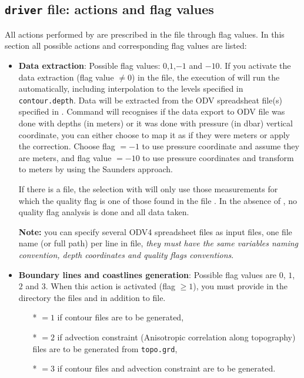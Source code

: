 \pagebreak 

\subsection{{\tt driver} file: actions and flag values\label{driverflags}}

All actions performed by  are prescribed in the file  through flag values. In this section all possible actions and corresponding flag values are listed:

\begin{itemize}
\item {\bf Data extraction}: Possible flag values: $0$,$1$,$-1$ and $-10$. If you activate the data extraction (flag value $\neq 0$) in the  file, the execution of  will run the  automatically, including interpolation to the levels specified in {\tt contour.depth}. Data will be extracted from the ODV spreadsheat file(s) specified in . Command  will recognises if the data export to ODV file was done with depths (in meters) or it was done with pressure (in dbar) vertical coordinate, you can either choose to map it as if they were meters or apply the \citet{SAUNDERS81} correction. Choose flag $=-1$ to use pressure coordinate and assume they are meters, and flag value $=-10$ to use pressure coordinates and transform to meters by using the Saunders approach.

If there is a  file, the selection with  will only use those measurements for which the quality flag is one of those found in the file . In the absence of , no quality flag analysis is done and all data taken.

{\bf Note:} you can specify several ODV4 spreadsheet files as input files, one file name (or full path) per line in  file, {\it they must have the same variables naming convention, depth coordinates and quality flags conventions}.

\item {\bf Boundary lines and coastlines generation}: Possible flag values are $0$, $1$, $2$ and $3$. When this action is activated (flag $\geq 1$), you must provide in the  directory the files  and   in addition to  file.
              \begin{itemize}
                \item[*] $=1$ if contour files are to be generated,
                \item[*] $=2$ if advection constraint (Anisotropic correlation along topography) files are to be generated from  \texttt{topo.grd},
                \item[*] $=3$ if contour files and advection constraint are to be generated.
              \end{itemize}


\end{itemize}
